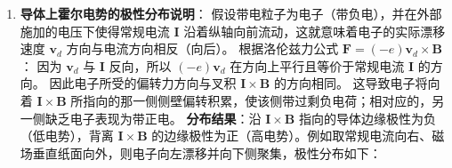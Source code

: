 \begin{solution}
\begin{enumerate}
    \item[(c)] \textbf{导体上霍尔电势的极性分布说明}：
    假设带电粒子为电子（带负电），并在外部施加的电压下使得常规电流 $\boldsymbol{I}$ 沿着纵轴向前流动，这就意味着电子的实际漂移速度 $\boldsymbol{v}_d$ 方向与电流方向相反（向后）。
    根据洛伦兹力公式 $\boldsymbol{F} = (-e)\boldsymbol{v}_d \times \boldsymbol{B}$：
    因为 $\boldsymbol{v}_d$ 与 $\boldsymbol{I}$ 反向，所以 $(-e)\boldsymbol{v}_d$ 在方向上平行且等价于常规电流 $\boldsymbol{I}$ 的方向。
    因此电子所受的偏转力方向与叉积 $\boldsymbol{I} \times \boldsymbol{B}$ 的方向相同。
    这导致电子将向着 $\boldsymbol{I} \times \boldsymbol{B}$ 所指向的那一侧侧壁偏转积累，使该侧带过剩负电荷；相对应的，另一侧缺乏电子表现为带正电。
    \textbf{分布结果}：沿 $\boldsymbol{I} \times \boldsymbol{B}$ 指向的导体边缘极性为负（低电势），背离 $\boldsymbol{I} \times \boldsymbol{B}$ 的边缘极性为正（高电势）。例如取常规电流向右、磁场垂直纸面向外，则电子向左漂移并向下侧聚集，极性分布如下：
    \begin{center}
    \end{center}
\end{enumerate}
\end{solution}


